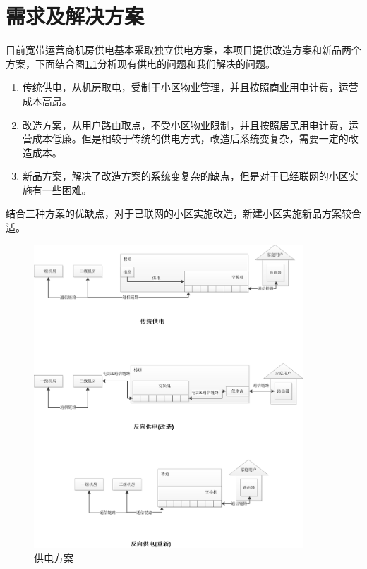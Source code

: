 \documentclass[12pt,a4paper]{report}
\begin{document}
\chapter{需求及解决方案}
目前宽带运营商机房供电基本采取独立供电方案，本项目提供改造方案和新品两个方案，下面结合图\ref{供电}分析现有供电的问题和我们解决的问题。
\begin{enumerate}
    \item 传统供电，从机房取电，受制于小区物业管理，并且按照商业用电计费，运营成本高昂。
    \item 改造方案，从用户路由取点，不受小区物业限制，并且按照居民用电计费，运营成本低廉。但是相较于传统的供电方式，改造后系统变复杂，需要一定的改造成本。
    \item 新品方案，解决了改造方案的系统变复杂的缺点，但是对于已经联网的小区实施有一些困难。
\end{enumerate}
结合三种方案的优缺点，对于已联网的小区实施改造，新建小区实施新品方案较合适。
\begin{figure}
    \begin{center}
    \includegraphics[width=0.9\textwidth]{fig/供电.jpg}
    \caption{供电方案}
    \label{供电}
    \end{center}
\end{figure}
\end{document}

